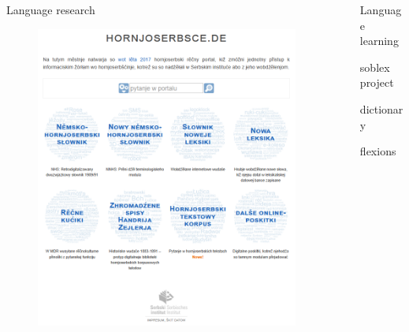 \documentclass[final]{beamer}
\newlength{\sepwidth}
\newlength{\colwidth}
\newcommand{\separatorcolumn}{\begin{column}{\sepwidth}\end{column}}
\begin{document}
\begin{frame}[t]
\begin{columns}[t]
\begin{column}{\colwidth}
\begin{block}{Language research}
    \begin{figure}
        \centering
        \includegraphics[width=0.7\colwidth]{hornjoserbsce_gross.png}
        \label{fig:hornjoserbsce}
    \end{figure}

  \end{block}

\end{column}

\separatorcolumn

\begin{column}{\colwidth}

  \begin{block}{Language learning}

    
    soblex project\cite{soblex}

    dictionary

    flexions


\end{block}
\end{column}
\end{columns}
\end{frame}
\end{document}
